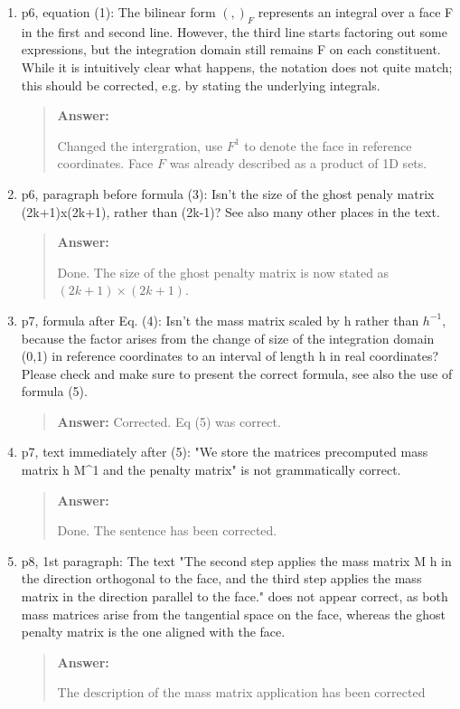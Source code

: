 \documentclass[11pt, a4paper]{article}
\newenvironment{answer}{%
      \begin{quote}%
            \color{blue!80!black}%
            \textbf{Answer:}%
            }{%
      \end{quote}%
}
\begin{document}
\begin{enumerate}[label=\textbullet, wide, labelindent=0pt]
      \item p6, equation (1): The bilinear form \( ( , )_F \) represents an integral over a face F in the first and
            second line. However, the third line starts factoring out some expressions, but the integration domain
            still
            remains F
            on each constituent. While it is intuitively clear what happens, the notation does not quite match; this
            should be
            corrected, e.g. by stating the underlying integrals.
            \begin{answer}
                  Changed the intergration, use $F^1$ to denote the face in reference coordinates. Face $F$ was already
                  described as a product of 1D sets.
            \end{answer}

      \item p6, paragraph before formula (3): Isn't the size of the ghost penaly matrix (2k+1)x(2k+1), rather than
            (2k-1)? See also many other places in the text.
            \begin{answer}
                  Done. The size of the ghost penalty matrix is now stated as
                  $(2k+1) \times (2k+1)$.
            \end{answer}

      \item p7, formula after Eq. (4): Isn't the mass matrix scaled by h rather than \(h^{-1}\), because the factor
            arises from the change of size of the integration domain (0,1) in reference coordinates to an interval of
            length h in
            real coordinates? Please check and make sure to present the correct formula, see also the use of formula
            (5).
            \begin{answer} Corrected. Eq (5) was correct.
            \end{answer}

      \item p7, text immediately after (5): "We store the matrices precomputed mass matrix h M\textasciicircum1 and
            the penalty matrix" is not grammatically correct.
            \begin{answer}
                  Done. The sentence has been corrected.
            \end{answer}

      \item p8, 1st paragraph: The text "The second step applies the mass matrix M h in the direction orthogonal to
            the face, and the third step applies the mass matrix in the direction parallel to the face." does not
            appear
            correct,
            as both mass matrices arise from the tangential space on the face, whereas the ghost penalty matrix is the
            one aligned
            with the face.
            \begin{answer}
                  The description of the mass matrix application has been corrected
            \end{answer}


\end{enumerate}
\end{document}
